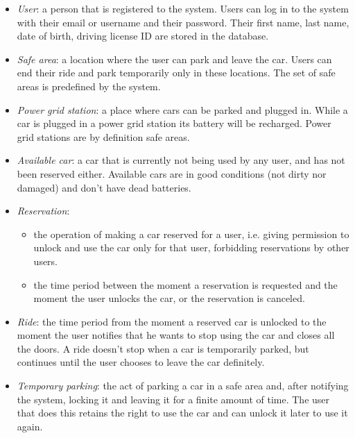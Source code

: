 \documentclass[english]{article}
\begin{document}
\begin{itemize}
\item{\textit{User}: a person that is registered to the system. Users can log in to the system with their email or username and their password. Their first name, last name, date of birth, driving license ID are stored in the database.}
\item{\textit{Safe area}: a location where the user can park and leave the car. Users can end their ride and park temporarily only in these locations. The set of safe areas is predefined by the system.}
\item{\textit{Power grid station}: a place where cars can be parked and plugged in. While a car is plugged in a power grid station its battery will be recharged. Power grid stations are by definition safe areas.}
\item{\textit{Available car}: a car that is currently not being used by any user, and has not been reserved either. Available cars are in good conditions (not dirty nor damaged) and don't have dead batteries.}
\item{\textit{Reservation}:
	\begin{itemize}
		\item{the operation of making a car reserved for a user, i.e. giving permission to unlock and use the car only for that user, forbidding reservations by other users.}
		\item{the time period between the moment a reservation is requested and the moment the user unlocks the car, or the reservation is canceled.}
	\end{itemize}
}
\item{\textit{Ride}: the time period from the moment a reserved car is unlocked to the moment the user notifies that he wants to stop using the car and closes all the doors. A ride doesn't stop when a car is temporarily parked, but continues until the user chooses to leave the car definitely.}
\item{\textit{Temporary parking}: the act of parking a car in a safe area and, after notifying the system, locking it and leaving it for a finite amount of time. The user that does this retains the right to use the car and can unlock it later to use it again.}

\end{itemize}
\end{document}
